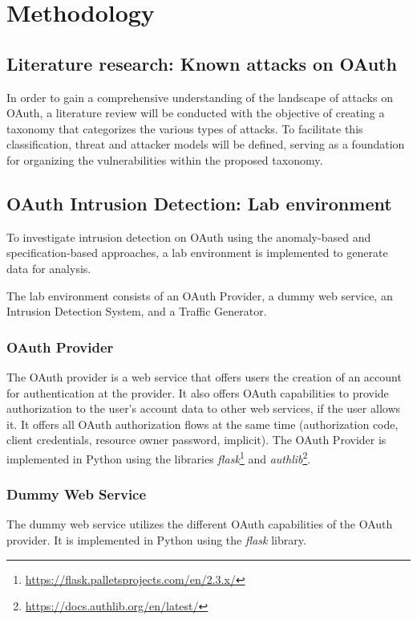 \documentclass{article}
\begin{document}
\section{Methodology}

\subsection{Literature research: Known attacks on OAuth}
In order to gain a comprehensive understanding of the landscape of attacks on OAuth, a literature review will be conducted with the objective of creating a taxonomy that categorizes the various types of attacks. To facilitate this classification, threat and attacker models will be defined, serving as a foundation for organizing the vulnerabilities within the proposed taxonomy.



\subsection{OAuth Intrusion Detection: Lab environment}
To investigate intrusion detection on OAuth using the anomaly-based and specification-based approaches, a lab environment is implemented to generate data for analysis.

The lab environment consists of an OAuth Provider, a dummy web service, an Intrusion Detection System, and a Traffic Generator.

\subsubsection{OAuth Provider}
The OAuth provider is a web service that offers users the creation of an account for authentication at the provider. It also offers OAuth capabilities to provide authorization to the user's account data to other web services, if the user allows it. It offers all OAuth authorization flows at the same time (authorization code, client credentials, resource owner password, implicit). The OAuth Provider is implemented in Python using the libraries \emph{flask}\footnote{\url{https://flask.palletsprojects.com/en/2.3.x/}} and \emph{authlib}\footnote{\url{https://docs.authlib.org/en/latest/}}.

\subsubsection{Dummy Web Service}
The dummy web service utilizes the different OAuth capabilities of the OAuth provider. It is implemented in Python using the \emph{flask} library.
\end{document}
